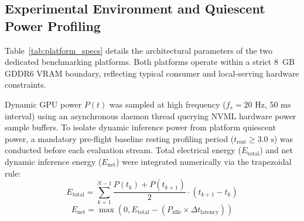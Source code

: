 \documentclass[runningheads]{llncs}
\begin{document}
\subsection{Experimental Environment and Quiescent Power Profiling}
\label{subsec:hardware_setup}
Table~\ref{tab:platform_specs} details the architectural parameters of the two dedicated benchmarking platforms. Both platforms operate within a strict 8~GB GDDR6 VRAM boundary, reflecting typical consumer and local-serving hardware constraints.
\begin{table}[htbp]
\centering
\caption{Microarchitectural Specifications of Evaluated GPU Platforms.}
\label{tab:platform_specs}
\small
{}
\end{table}
Dynamic GPU power $P(t)$ was sampled at high frequency ($f_s = 20\text{ Hz}$, $50\text{ ms}$ interval) using an asynchronous daemon thread querying NVML hardware power sample buffers. To isolate dynamic inference power from platform quiescent power, a mandatory pre-flight baseline resting profiling period ($t_{\text{rest}} \ge 3.0\text{ s}$) was conducted before each evaluation stream. Total electrical energy ($E_{\text{total}}$) and net dynamic inference energy ($E_{\text{net}}$) were integrated numerically via the trapezoidal rule:
\begin{equation}
E_{\text{total}} = \sum_{k=1}^{N-1} \frac{P(t_k) + P(t_{k+1})}{2} \cdot (t_{k+1} - t_k)
\end{equation}
\begin{equation}
E_{\text{net}} = \max\left(0, E_{\text{total}} - (P_{\text{idle}} \times \Delta t_{\text{latency}})\right)
\end{equation}
\end{document}
